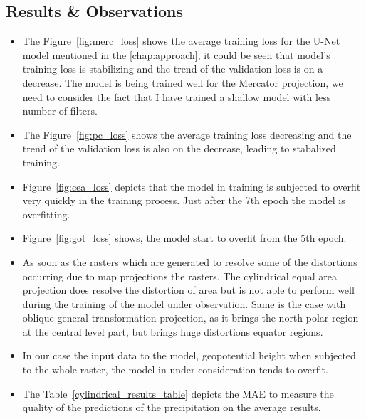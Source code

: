 \subsection{Results \& Observations}
\begin{itemize}
    \item The Figure~\ref{fig:merc_loss} shows the average training loss for the U-Net model mentioned in the \autoref{chap:approach}, it could be seen that model's training loss is stabilizing and the trend of the validation loss is on a decrease.
          The model is being trained well for the Mercator projection, we need to consider the fact that I have trained a shallow model with less number of filters.
    \item The Figure~\ref{fig:pc_loss} shows the average training loss decreasing and the trend of the validation loss is also on the decrease, leading to stabalized training.
    \item Figure~\ref{fig:cea_loss} depicts that the model in training is subjected to overfit very quickly in the training process. Just after the 7th epoch the model is overfitting.
    \item Figure~\ref{fig:got_loss} shows, the model start to overfit from the 5th epoch.
    \item As soon as the rasters which are generated to resolve some of the distortions occurring due to map projections the rasters.
          The cylindrical equal area projection does resolve the distortion of area but is not able to perform well during the training of the model under observation.
          Same is the case with oblique general transformation projection, as it brings the north polar region at the central level part, but brings huge distortions equator regions.
    \item In our case the input data to the model, geopotential height when subjected to the whole raster, the model in under consideration tends to overfit.
    \item The Table~\ref{cylindrical_results_table} depicts the MAE to measure the quality of the predictions of the precipitation on the average results.

\end{itemize}
